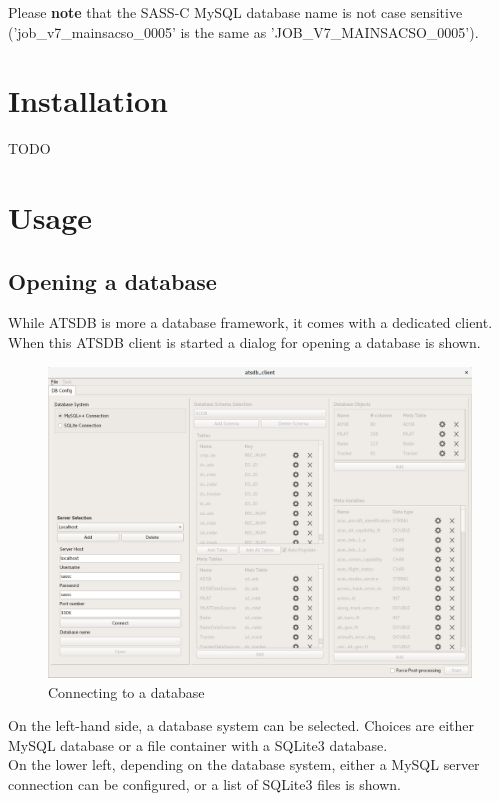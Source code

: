 \documentclass[10pt,letterpaper,extrafontsizes]{memoir}
\begin{document}
Please \textbf{note} that the SASS-C MySQL database name is not case sensitive ('job\_v7\_mainsacso\_0005' is the same as 'JOB\_V7\_MAINSACSO\_0005').

\chapter{Installation}
\label{sec:installation}

TODO

\chapter{Usage}
\label{sec:usage}

\section{Opening a database}
\label{sec:startup}

While ATSDB is more a database framework, it comes with a dedicated client. When this ATSDB client is started a dialog  for opening a database is shown. 

\begin{figure}[H]
  \hspace*{-3cm}
    \includegraphics[width=18cm]{../screenshots/db_config_connect.png}
  \caption{Connecting to a database}
  \label{fig:db_connect}
\end{figure}

On the left-hand side, a database system can be selected.  Choices are either MySQL database or a file container with a SQLite3 database. \\
On the lower left, depending on the database system, either a MySQL server connection can be configured, or a list of SQLite3 files is shown.\\
\end{document}
